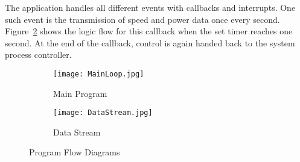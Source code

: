 The application handles all different events with callbacks and interrupts. One such event is the transmission of speed and power data once every second. Figure~\ref{fig:spdsend} shows the logic flow for this callback when the set timer reaches one second. At the end of the callback, control is again handed back to the system process controller.

\begin{figure}[H]
	\centering
	\begin{subfigure}[t]{.4\textwidth}
		\centering
		\texttt{[image: MainLoop.jpg]}
		\caption{Main Program}
		\label{fig:main}
	\end{subfigure}%
\hfill
	\begin{subfigure}[t]{0.5\textwidth}
		\centering
		\texttt{[image: DataStream.jpg]}
		\caption{Data Stream}
		\label{fig:spdsend}
	\end{subfigure}
	\caption{Program Flow Diagrams}
	\label{fig:flow}
\end{figure}

%
%
%
%


